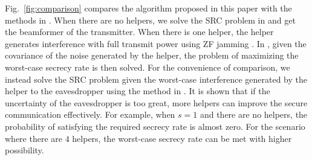 \documentclass[journal]{IEEEtran}
\begin{document}
Fig.~\ref{fig:comparison} compares the algorithm proposed in this paper with the methods in \cite{huang_cooperative_2011,li_optimal_2011}. When there are no helpers, we solve the SRC problem in \cite{li_optimal_2011} and get the beamformer of the transmitter. When there is one helper, the helper generates interference with full transmit power using ZF jamming \cite{huang_robust_2012}. In \cite{huang_robust_2012}, given the covariance of the noise generated by the helper, the problem of maximizing the worst-case secrecy rate is then solved. For the convenience of comparison, we instead solve the SRC problem given the worst-case interference generated by the helper to the eavesdropper using the method in \cite{li_optimal_2011}. It is shown that if the uncertainty of the eavesdropper is too great, more helpers can improve the secure communication effectively. For example, when $s = 1$ and there are no helpers, the probability of satisfying the required secrecy rate is almost zero. For the scenario where there are $4$ helpers, the worst-case secrecy rate can be met with higher possibility.  
%
%

\end{document}
